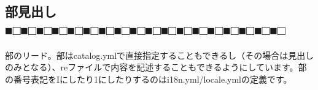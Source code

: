 \begin{reviewpart}
\part{部見出し■□■□■□■□■□■□■□■□■□■□■□■□■□■□■□■□■□■□}
\label{chap:part2}

部のリード。部はcatalog.ymlで直接指定することもできるし（その場合は見出しのみとなる）、reファイルで内容を記述することもできるようにしています。部の番号表記をIにしたり1にしたりするのはi18n.yml/locale.ymlの定義です。

\end{reviewpart}
